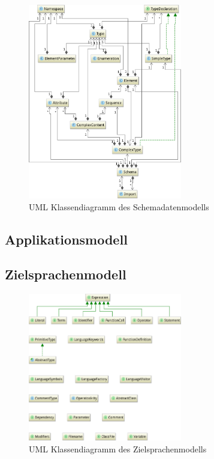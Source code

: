 \begin{figure}[tb]
    \begin{center}
        \includegraphics[width=0.6\textwidth]{resources/typemodel}
    \end{center}
    \caption{UML Klassendiagramm des Schemadatenmodells}
    \label{fig:schema_model}
\end{figure}

\subsection{Applikationsmodell}
\label{sec:application_model}

\subsection{Zielsprachenmodell}
\label{sec:abstract_target_language_model}

\begin{figure}[tb]
    \begin{center}
        \includegraphics[width=0.6\textwidth]{resources/languagemodel}
    \end{center}
    \caption{UML Klassendiagramm des Zielsprachenmodells}
    \label{fig:language_model}
\end{figure}

